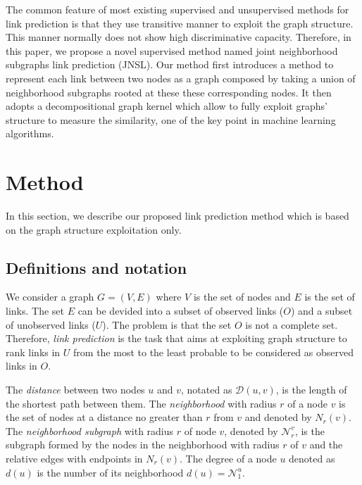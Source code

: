 \documentclass[runningheads,a4paper]{llncs}
\begin{document}
The common feature of most existing supervised and unsupervised methods for link prediction is that they use transitive manner to exploit the graph structure. This manner normally does not show high discriminative capacity. Therefore, in this paper, we propose a novel supervised method named joint neighborhood subgraphs link prediction (JNSL). Our method first introduces a method to represent each link between two nodes as a graph composed by taking a union of neighborhood subgraphs rooted at these these corresponding nodes. It then adopts a decompositional graph kernel which allow to fully exploit graphs' structure to measure the similarity, one of the key point in machine learning algorithms.

\section{Method}
In this section, we describe our proposed link prediction method which is based on the graph structure exploitation only.
\subsection{Definitions and notation}
We consider a graph $G=(V,E)$ where $V$ is the set of nodes and $E$ is the set of links. The set $E$ can be devided into a subset of observed links ($O$) and a subset of unobserved links ($U$). The problem is that the set $O$ is not a complete set. Therefore, \textit{link prediction} is the task that aims at exploiting graph structure to rank links in $U$ from the most to the least probable to be considered as observed links in $O$.

The \textit{distance} between two nodes $u$ and $v$, notated as $\mathcal{D}(u,v)$, is the length of the shortest path between them. The \textit{neighborhood} with radius $r$ of a node $v$ is the set of nodes
at a distance no greater than $r$ from $v$ and denoted by $N_r(v)$. The \textit{neighborhood subgraph} with radius $r$ of node $v$, denoted by $\mathcal{N}_{r}^{v}$,  is the subgraph formed by the nodes in the
neighborhood with radius $r$ of $v$ and the relative edges with endpoints in $N_r(v)$. The degree of a node $u$ denoted as $d(u)$ is the number of its neighborhood $d(u) = \mathcal{N}_{1}^{u}$.
\end{document}
